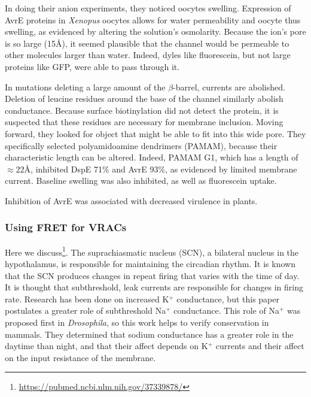 In doing their anion experiments, they noticed oocytes swelling. Expression of AvrE proteins in \textit{Xenopus} oocytes allows for water permeability and oocyte thus swelling, as evidenced by altering the solution's osmolarity. Because the ion's pore is so large (15\AA), it seemed plausible that the channel would be permeable to other molecules larger than water. Indeed, dyles like fluorescein, but not large proteins like GFP, were able to pass through it. \newline

In mutations deleting a large amount of the $\beta$-barrel, currents are abolished. Deletion of leucine residues around the base of the channel similarly abolish conductance. Because surface biotinylation did not detect the protein, it is suspected that these residues are necessary for membrane inclusion. Moving forward, they looked for object that might be able to fit into this wide pore. They specifically selected polyamidoamine dendrimers (PAMAM), because their characteristic length can be altered. Indeed, PAMAM G1, which has a length of $\approx 22$\AA, inhibited DspE 71\% and AvrE 93\%, as evidenced by limited membrane current. Baseline swelling was also inhibited, as well as fluorescein uptake.\newline

Inhibition of AvrE was associated with decreased virulence in plants. 

\subsubsection{Using FRET for VRACs}

Here we discuss\footnote{\url{https://pubmed.ncbi.nlm.nih.gov/37339878/}}. The suprachiasmatic nucleus (SCN), a bilateral nucleus in the hypothalamus, is responsible for maintaining the circadian rhythm. It is known that the SCN produces changes in repeat firing that varies with the time of day. It is thought that subthreshold, leak currents are responsible for changes in firing rate. Research has been done on increased K$^+$ conductance, but this paper postulates a greater role of subthreshold Na$^+$ conductance. This role of Na$^+$ was proposed first in \textit{Drosophila}, so this work helps to verify conservation in mammals. They determined that sodium conductance has a greater role in the daytime than night, and that their affect depends on K$^+$ currents and their affect on the input resistance of the membrane.\newline

